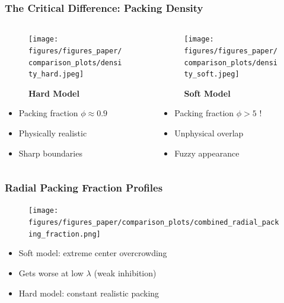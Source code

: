 \documentclass[10pt,t]{beamer}
\begin{document}
\begin{frame}
    \frametitle{The Critical Difference: Packing Density}

    \begin{columns}
        \begin{column}{0.5\textwidth}
            \begin{figure}
                \centering
                \texttt{[image: figures/figures\_paper/comparison\_plots/density\_hard.jpeg]}
                \caption*{\textbf{Hard Model}}
            \end{figure}

            \vspace{-0.2cm}

            \begin{itemize}
                \item Packing fraction $\phi \approx 0.9$
                \item Physically realistic
                \item Sharp boundaries
            \end{itemize}
        \end{column}

        \begin{column}{0.5\textwidth}
            \begin{figure}
                \centering
                \texttt{[image: figures/figures\_paper/comparison\_plots/density\_soft.jpeg]}
                \caption*{\textbf{Soft Model}}
            \end{figure}

            \vspace{-0.2cm}

            \begin{itemize}
                \item Packing fraction $\phi > 5$ !
                \item Unphysical overlap
                \item Fuzzy appearance
            \end{itemize}
        \end{column}
    \end{columns}

\end{frame}

\begin{frame}
    \frametitle{Radial Packing Fraction Profiles}

    \begin{figure}
        \centering
        \texttt{[image: figures/figures\_paper/comparison\_plots/combined\_radial\_packing\_fraction.png]}
    \end{figure}

    \begin{itemize}
        \item Soft model: extreme center overcrowding
        \item Gets worse at low $\lambda$ (weak inhibition)
        \item Hard model: constant realistic packing
    \end{itemize}

\end{frame}
\end{document}
